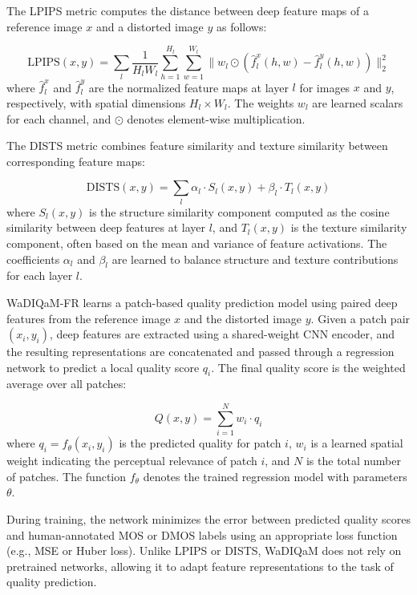 The LPIPS metric computes the distance between deep feature maps of a reference image $x$ and a distorted image $y$ as follows:

\begin{equation}
\text{LPIPS}(x, y) = \sum_{l} \frac{1}{H_l W_l} \sum_{h=1}^{H_l} \sum_{w=1}^{W_l} \| w_l \odot (\hat{f}_l^x(h, w) - \hat{f}_l^y(h, w)) \|_2^2
\end{equation}
where $\hat{f}_l^x$ and $\hat{f}_l^y$ are the normalized feature maps at layer $l$ for images $x$ and $y$, respectively, with spatial dimensions $H_l \times W_l$. The weights $w_l$ are learned scalars for each channel, and $\odot$ denotes element-wise multiplication.

The DISTS metric combines feature similarity and texture similarity between corresponding feature maps:

\begin{equation}
\text{DISTS}(x, y) = \sum_{l} \alpha_l \cdot S_l(x, y) + \beta_l \cdot T_l(x, y)
\end{equation}
where $S_l(x, y)$ is the structure similarity component computed as the cosine similarity between deep features at layer $l$, and $T_l(x, y)$ is the texture similarity component, often based on the mean and variance of feature activations. The coefficients $\alpha_l$ and $\beta_l$ are learned to balance structure and texture contributions for each layer $l$.

WaDIQaM-FR learns a patch-based quality prediction model using paired deep features from the reference image $x$ and the distorted image $y$. Given a patch pair $(x_i, y_i)$, deep features are extracted using a shared-weight CNN encoder, and the resulting representations are concatenated and passed through a regression network to predict a local quality score $q_i$. The final quality score is the weighted average over all patches:

\begin{equation}
Q(x, y) = \sum_{i=1}^{N} w_i \cdot q_i
\end{equation}
where $q_i = f_{\theta}(x_i, y_i)$ is the predicted quality for patch $i$, $w_i$ is a learned spatial weight indicating the perceptual relevance of patch $i$, and $N$ is the total number of patches. The function $f_{\theta}$ denotes the trained regression model with parameters $\theta$.

During training, the network minimizes the error between predicted quality scores and human-annotated MOS or DMOS labels using an appropriate loss function (e.g., MSE or Huber loss). Unlike LPIPS or DISTS, WaDIQaM does not rely on pretrained networks, allowing it to adapt feature representations to the task of quality prediction.

